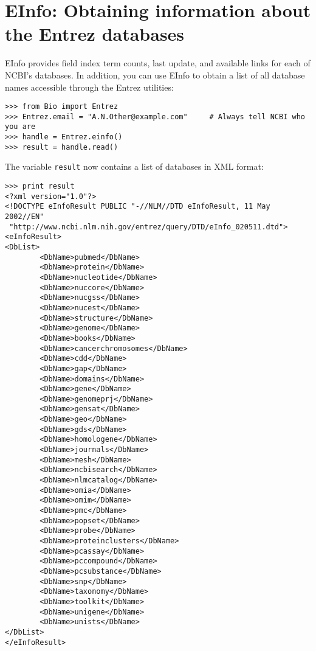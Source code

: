 \documentclass{report}
\begin{document}
\section{EInfo: Obtaining information about the Entrez databases}
\label{sec:entrez-einfo}
EInfo provides field index term counts, last update, and available links for each of NCBI's databases. In addition, you can use EInfo to obtain a list of all database names accessible through the Entrez utilities:
\begin{verbatim}
>>> from Bio import Entrez
>>> Entrez.email = "A.N.Other@example.com"     # Always tell NCBI who you are
>>> handle = Entrez.einfo()
>>> result = handle.read()
\end{verbatim}
The variable \verb+result+ now contains a list of databases in XML format:
\begin{verbatim}
>>> print result
<?xml version="1.0"?>
<!DOCTYPE eInfoResult PUBLIC "-//NLM//DTD eInfoResult, 11 May 2002//EN"
 "http://www.ncbi.nlm.nih.gov/entrez/query/DTD/eInfo_020511.dtd">
<eInfoResult>
<DbList>
        <DbName>pubmed</DbName>
        <DbName>protein</DbName>
        <DbName>nucleotide</DbName>
        <DbName>nuccore</DbName>
        <DbName>nucgss</DbName>
        <DbName>nucest</DbName>
        <DbName>structure</DbName>
        <DbName>genome</DbName>
        <DbName>books</DbName>
        <DbName>cancerchromosomes</DbName>
        <DbName>cdd</DbName>
        <DbName>gap</DbName>
        <DbName>domains</DbName>
        <DbName>gene</DbName>
        <DbName>genomeprj</DbName>
        <DbName>gensat</DbName>
        <DbName>geo</DbName>
        <DbName>gds</DbName>
        <DbName>homologene</DbName>
        <DbName>journals</DbName>
        <DbName>mesh</DbName>
        <DbName>ncbisearch</DbName>
        <DbName>nlmcatalog</DbName>
        <DbName>omia</DbName>
        <DbName>omim</DbName>
        <DbName>pmc</DbName>
        <DbName>popset</DbName>
        <DbName>probe</DbName>
        <DbName>proteinclusters</DbName>
        <DbName>pcassay</DbName>
        <DbName>pccompound</DbName>
        <DbName>pcsubstance</DbName>
        <DbName>snp</DbName>
        <DbName>taxonomy</DbName>
        <DbName>toolkit</DbName>
        <DbName>unigene</DbName>
        <DbName>unists</DbName>
</DbList>
</eInfoResult>
\end{verbatim}
\end{document}
